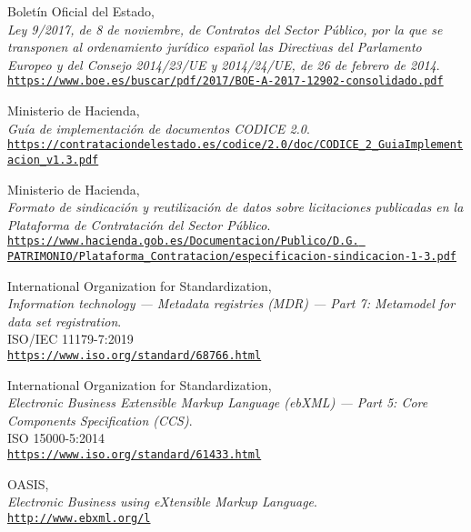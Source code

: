 \begin{thebibliography}{X}
            Boletín Oficial del Estado,
            \\ \textit{Ley 9/2017, de 8 de noviembre, de Contratos del Sector Público, por la que se transponen al ordenamiento jurídico español las Directivas del Parlamento Europeo y del Consejo 2014/23/UE y 2014/24/UE, de 26 de febrero de 2014}.
            \\ \texttt{\url{https://www.boe.es/buscar/pdf/2017/BOE-A-2017-12902-consolidado.pdf}}
            
            Ministerio de Hacienda,
            \\ \textit{Guía de implementación de documentos CODICE 2.0}.
            \\ \texttt{\url{https://contrataciondelestado.es/codice/2.0/doc/CODICE_2_GuiaImplementacion_v1.3.pdf}}
            
            Ministerio de Hacienda,
            \\ \textit{Formato de sindicación y reutilización de datos sobre licitaciones publicadas en la Plataforma de Contratación del Sector Público}.
            \\ \texttt{\url{https://www.hacienda.gob.es/Documentacion/Publico/D.G. PATRIMONIO/Plataforma_Contratacion/especificacion-sindicacion-1-3.pdf}}
            
            International Organization for Standardization,
            \\ \textit{Information technology — Metadata registries (MDR) — Part 7: Metamodel for data set registration}.\\
            ISO/IEC 11179-7:2019
            \\ \texttt{\url{https://www.iso.org/standard/68766.html}}
            
            International Organization for Standardization,
            \\ \textit{Electronic Business Extensible Markup Language (ebXML) — Part 5: Core Components Specification (CCS)}.\\
            ISO 15000-5:2014
            \\ \texttt{\url{https://www.iso.org/standard/61433.html}}
            
            OASIS,
            \\ \textit{Electronic Business using eXtensible Markup Language}.
            \\ \texttt{\url{http://www.ebxml.org/l}}
            

\end{thebibliography}
